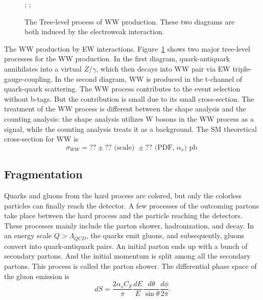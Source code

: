 \begin{figure}[ht]
    \centering
    ; \qquad
    ;
    \caption{The Tree-level process of WW production. These two diagrams are both induced by the electroweak interaction. }
    \label{fig:relatedWorks:ppCollision:ww}
\end{figure}

\noindent The WW production by EW interactions. Figure~\ref{fig:relatedWorks:ppCollision:ww} shows two major tree-level processes for the WW production. In the first diagram, quark-antiquark annihilates into a virtual $Z/\gamma$, which then decays into WW pair via EW triple-gauge-coupling. In the second diagram, WW is produced in the t-channel of quark-quark scattering. The WW process contributes to the event selection without b-tags. But the contribution is small due to its small cross-section. The treatment of the WW process is different between the shape analysis and the counting analysis: the shape analysis utilizes W bosons in the WW process as a signal, while the counting analysis treats it as a background. The SM theoretical cross-section for WW is 
\begin{equation}
    \sigma_{WW} = ?? \pm ??  \text{ (scale) }  \pm ??  \text{ (PDF, $\alpha_s$) pb }
\end{equation}


\subsection{Fragmentation}
\label{sec:relatedWorks:ppCollision:psJet} 

Quarks and gluons from the hard process are colored, but only the colorless particles can finally reach the detector. A few processes of the outcoming partons take place between the hard process and the particle reaching the detectors. These processes mainly include the parton shower, hadronization, and decay. In an energy scale $Q>\Lambda_{QCD}$, the quarks emit gluons, and subsequently, gluons convert into quark-antiquark pairs. An initial parton ends up with a bunch of secondary partons. And the initial momentum is split among all the secondary partons. This process is called the parton shower. The differential phase space of the gluon emission is
\begin{equation}
    dS = \frac{2\alpha_s C_F}{\pi} \frac{dE}{E}\frac{d\theta}{\sin \theta} \frac{d\phi}{2\pi}.
\end{equation}

